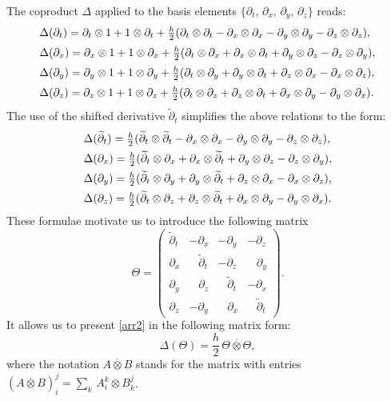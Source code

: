 \documentclass[10pt,a4paper]{amsart}
\newcommand{\pa}{\partial}
\newcommand{\De}{\Delta}
\newcommand{\ot}{\otimes}
\newcommand{\tpa}{\widetilde{\pa}}
\numberwithin{equation}{section}
\begin{document}
The coproduct $\De$ applied to the basis elements $\{\pa_t,\,\pa_x,\,\pa_y,\,\pa_z\}$ reads:
\begin{equation}
\begin{array}{l}
	\De(\pa_t)=\pa_t\ot 1+ 1\ot \pa_t+\frac{h}{2}(\pa_t\ot \pa_t-\pa_x\ot \pa_x-\pa_y\ot \pa_y-\pa_z\ot \pa_z),\\
	\rule{0pt}{5mm}
	\rule{0pt}{5mm}
	\De(\pa_x)=\pa_x\ot 1+ 1\ot \pa_x +   \frac{h}{2}(\pa_t\ot \pa_x+\pa_x\ot \pa_t+\pa_y\ot \pa_z-\pa_z\ot \pa_y),\\
	\rule{0pt}{5mm}
	\De(\pa_y)=\pa_y\ot 1+ 1\ot \pa_y+  \frac{h}{2}(\pa_t\ot \pa_y+\pa_y\ot \pa_t+\pa_z\ot \pa_x-\pa_x\ot \pa_z),\\
	\rule{0pt}{5mm}
	\De(\pa_z)=\pa_z\ot 1+ 1\ot \pa_z+ \frac{h}{2}(\pa_t\ot \pa_z+\pa_z\ot \pa_t+\pa_x\ot \pa_y-\pa_y\ot \pa_x).
\end{array}
\label{arr0}
\end{equation}
The use of the shifted derivative $\tpa_t$ simplifies the above relations to the form:
\begin{equation}
\begin{array}{l}
	\De(\tpa_t)=\frac{h}{2}(\tpa_t\ot \tpa_t-\pa_x\ot \pa_x-\pa_y\ot \pa_y-\pa_z\ot \pa_z),\\
	\rule{0pt}{5mm}
	\rule{0pt}{5mm}
	\De(\pa_x)=\frac{h}{2}(\tpa_t\ot \pa_x+\pa_x\ot \tpa_t+\pa_y\ot \pa_z-\pa_z\ot \pa_y),\\
	\rule{0pt}{5mm}
	\De(\pa_y)=\frac{h}{2}(\tpa_t\ot \pa_y+\pa_y\ot \tpa_t+\pa_z\ot \pa_x-\pa_x\ot \pa_z),\\
	\rule{0pt}{5mm}
	\De(\pa_z)=\frac{h}{2}(\tpa_t\ot \pa_z+\pa_z\ot \tpa_t+\pa_x\ot \pa_y-\pa_y\ot \pa_x).
\end{array} \label{arr2}
\end{equation}
These formulae motivate us to introduce   the following matrix
\begin{equation} {\Theta}=\left(\begin{array}{llll}
	\tpa_t&-\pa_x&-\pa_y&-\pa_z\\
	\pa_x&\,\,\,\,\,\tpa_t&-\pa_z&\,\,\,\,\,\pa_y\\
	\pa_y&\,\,\,\,\,\pa_z&\,\,\,\,\,\tpa_t&-\pa_x\\
	\pa_z&-\pa_y&\,\,\,\,\,\pa_x&\,\,\,\,\,\tpa_t \end{array} \right). \label{seven}
\end{equation}
It allows us to present \eqref{arr2} in the following matrix form:
\[
\De ({\Theta})=\frac{h}{2}\, {\Theta} \stackrel{.}{\otimes} {\Theta},
\]
where the notation $A\stackrel{.}{\otimes} B$ stands for the matrix with entries $(A\stackrel{.}{\otimes} B)_i^j=\sum_k\, A_i^k\ot B_k^j $.
\end{document}
